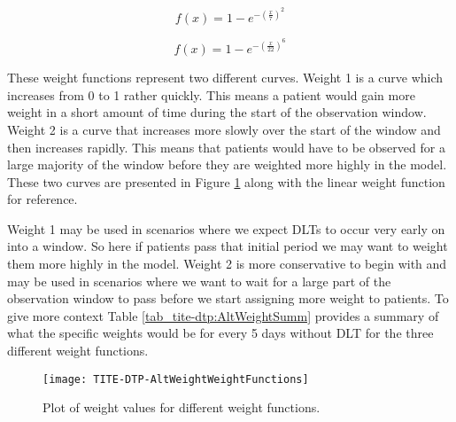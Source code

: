 \begin{equation}
	\label{eqn_tite-dtp:AltWeightW1}
	f(x) = 1 - e^{-({\frac{x}{7}})^{2}}
\end{equation}

\begin{equation}
	\label{eqn_tite-dtp:AltWeightW2}
	f(x) = 1 - e^{-({\frac{x}{22}})^{6}}
\end{equation}

These weight functions represent two different curves. Weight 1 is a curve which increases from 0 to 1 rather quickly. This means a patient would gain more weight in a short amount of time during the start of the observation window. Weight 2 is a curve that increases more slowly over the start of the window and then increases rapidly. This means that patients would have to be observed for a large majority of the window before they are weighted more highly in the model. These two curves are presented in Figure \ref{fig_tite-dtp:AltWeight-WeightFunctions} along with the linear weight function for reference. 

Weight 1 may be used in scenarios where we expect DLTs to occur very early on into a window. So here if patients pass that initial period we may want to weight them more highly in the model. Weight 2 is more conservative to begin with and may be used in scenarios where we want to wait for a large part of the observation window to pass before we start assigning more weight to patients. To give more context Table \ref{tab_tite-dtp:AltWeightSumm} provides a summary of what the specific weights would be for every 5 days without DLT for the three different weight functions. 

\begin{figure}[h!]
	\centering
	\caption{Plot of weight values for different weight functions.}
	\label{fig_tite-dtp:AltWeight-WeightFunctions}
	\texttt{[image: TITE-DTP-AltWeightWeightFunctions]}
\end{figure}

